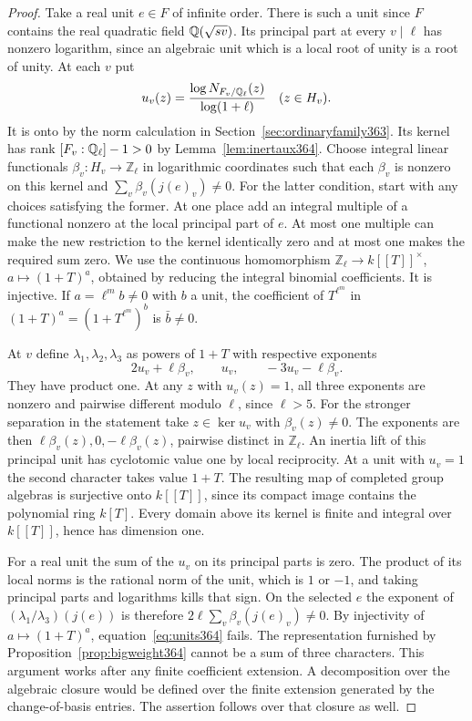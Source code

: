 \documentclass[a4paper,11pt]{article}
\theoremstyle{definition}
\theoremstyle{remark}
\newcommand{\ZZ}{\mathbb Z}\newcommand{\ord}{\operatorname{ord}}
\numberwithin{equation}{section}
\begin{document}
\begin{proof}
Take a real unit \(e\in F\) of infinite order. There is such a
unit since \(F\) contains the real quadratic field
\(\mathbb Q(\sqrt{sv})\). Its principal part at every \(v\mid\ell\)
has nonzero logarithm, since an algebraic unit which is a
local root of unity is a root of unity. At each \(v\) put
\[
 u_v(z)=\frac{\log N_{F_v/\mathbb Q_\ell}(z)}{\log(1+\ell)}
       \quad(z\in H_v).
\]
It is onto by the norm calculation in
Section~\ref{sec:ordinaryfamily363}. Its kernel has rank
\([F_v:\mathbb Q_\ell]-1>0\) by Lemma~\ref{lem:inertaux364}.
Choose integral linear functionals \(\beta_v:H_v\to\ZZ_\ell\)
in logarithmic coordinates such that each \(\beta_v\) is
nonzero on this kernel and
\(\sum_v\beta_v(j(e)_v)\ne0\). For the latter condition,
start with any choices satisfying the former. At one place
add an integral multiple of a functional nonzero at the
local principal part of \(e\). At most one multiple can
make the new restriction to the kernel identically zero
and at most one makes the required sum zero.
We use the continuous
homomorphism \(\ZZ_\ell\to k[[T]]^\times\),
\(a\mapsto(1+T)^a\), obtained by reducing the integral
binomial coefficients. It is injective. If
\(a=\ell^m b\ne0\) with \(b\) a unit, the coefficient of
\(T^{\ell^m}\) in \((1+T)^a=(1+T^{\ell^m})^b\) is
\(\bar b\ne0\).

At \(v\) define \(\lambda_1,\lambda_2,\lambda_3\) as powers
of \(1+T\) with respective exponents
\[
                2u_v+\ell\beta_v,\qquad
                u_v,\qquad
               -3u_v-\ell\beta_v .
\]
They have product one. At any \(z\) with \(u_v(z)=1\), all
three exponents are nonzero and pairwise different modulo
\(\ell\), since \(\ell>5\). For the stronger separation in
the statement take \(z\in\ker u_v\) with \(\beta_v(z)\ne0\).
The exponents are then \(\ell\beta_v(z),0,-\ell\beta_v(z)\),
pairwise distinct in \(\ZZ_\ell\). An inertia lift of this
principal unit has cyclotomic value one by local reciprocity.
At a unit with \(u_v=1\) the second character takes value
\(1+T\). The resulting
map of completed group algebras is surjective onto \(k[[T]]\),
since its compact image contains the polynomial ring \(k[T]\).
Every domain above its kernel is finite and integral over
\(k[[T]]\), hence has dimension one.

For a real unit the sum of the \(u_v\) on its principal parts
is zero. The product of its local norms is the rational norm
of the unit, which is \(1\) or \(-1\), and taking principal
parts and logarithms kills that sign. On the selected \(e\)
the exponent of \((\lambda_1/\lambda_3)(j(e))\) is therefore
\(2\ell\sum_v\beta_v(j(e)_v)\ne0\). By injectivity of
\(a\mapsto(1+T)^a\), equation~\eqref{eq:units364} fails.
The representation furnished by Proposition~\ref{prop:bigweight364}
cannot be a sum of three characters. This argument works
after any finite coefficient extension. A decomposition over
the algebraic closure would be defined over the finite
extension generated by the change-of-basis entries.
The assertion follows over that closure as well.


\end{proof}
\end{document}

